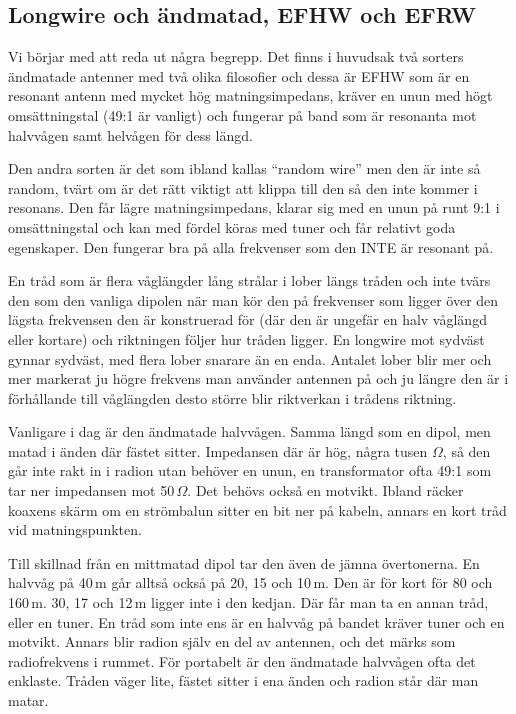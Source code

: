 \subsection{Longwire och ändmatad, EFHW och EFRW}

Vi börjar med att reda ut några begrepp. Det finns i huvudsak två
sorters ändmatade antenner med två olika filosofier och dessa är EFHW
som är en resonant antenn med mycket hög matningsimpedans, kräver en
unun med högt omsättningstal (49:1 är vanligt) och fungerar på band
som är resonanta mot halvvågen samt helvågen för dess längd.

Den andra sorten är det som ibland kallas ``random wire'' men den är
inte så random, tvärt om är det rätt viktigt att klippa till den så
den inte kommer i resonans. Den får lägre matningsimpedans, klarar sig
med en unun på runt 9:1 i omsättningstal och kan med fördel köras med
tuner och får relativt goda egenskaper. Den fungerar bra på alla
frekvenser som den INTE är resonant på.

En tråd som är flera våglängder lång strålar i lober längs tråden och
inte tvärs den som den vanliga dipolen när man kör den på frekvenser
som ligger över den lägsta frekvensen den är konstruerad för (där den
är ungefär en halv våglängd eller kortare) och riktningen följer hur
tråden ligger. En longwire mot sydväst gynnar sydväst, med flera lober
snarare än en enda. Antalet lober blir mer och mer markerat ju högre
frekvens man använder antennen på och ju längre den är i förhållande
till våglängden desto större blir riktverkan i trådens riktning.

Vanligare i dag är den ändmatade halvvågen. Samma längd som en dipol,
men matad i änden där fästet sitter. Impedansen där är hög, några
tusen $\Omega$, så den går inte rakt in i radion utan behöver en unun,
en transformator ofta 49:1 som tar ner impedansen mot
50\,$\Omega$. Det behövs också en motvikt. Ibland räcker koaxens skärm
om en strömbalun sitter en bit ner på kabeln, annars en kort tråd vid
matningspunkten.

Till skillnad från en mittmatad dipol tar den även de jämna
övertonerna. En halvvåg på 40\,m går alltså också på 20, 15 och 10\,m.
Den är för kort för 80 och 160\,m. 30, 17 och 12\,m ligger inte i den
kedjan. Där får man ta en annan tråd, eller en tuner. En tråd som inte
ens är en halvvåg på bandet kräver tuner och en motvikt. Annars blir
radion själv en del av antennen, och det märks som radiofrekvens i
rummet. För portabelt är den ändmatade halvvågen ofta det enklaste.
Tråden väger lite, fästet sitter i ena änden och radion står där man
matar.

